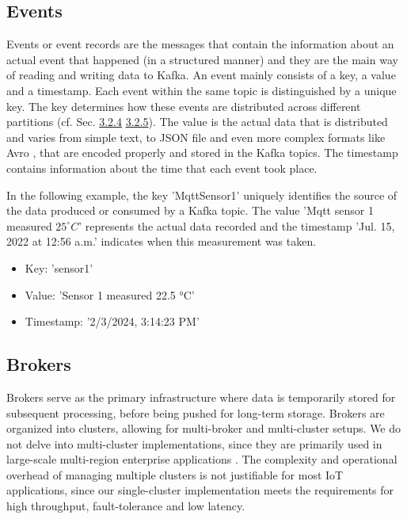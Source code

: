 \subsection{Events}
\label{events}
Events or event records are the messages that contain the information about an actual event that happened (in a structured manner) and they are the main way of reading and writing data to Kafka. An event mainly consists of a key, a value and a timestamp.
Each event within the same topic is distinguished by a unique key. The key determines how these events are distributed across different partitions (cf. Sec. \hyperref[kafka_topics]{3.2.4} \hyperref[kafka_partitions]{ 3.2.5}).
The value is the actual data that is distributed and varies from simple text, to JSON file and even more complex formats like Avro \cite{Avro}, that are encoded properly and stored in the Kafka topics. The timestamp contains information about the time that each event took place.

In the following example, the key 'MqttSensor1' uniquely identifies the source of the data produced or consumed by a Kafka topic. The value 'Mqtt sensor 1 measured $25^{\circ}C$' represents the actual data recorded and the timestamp 'Jul. 15, 2022 at 12:56 a.m.' indicates when this measurement was taken.
\begin{itemize}
    \item Key: 'sensor1'
    \item Value: 'Sensor 1 measured 22.5 \si{\celsius}'
    \item Timestamp: '2/3/2024, 3:14:23 PM'
\end{itemize}

\subsection{Brokers}
Brokers serve as the primary infrastructure where data is temporarily stored for subsequent processing, before being pushed for long-term storage. Brokers are organized into clusters, allowing for multi-broker and multi-cluster setups. We do not delve into multi-cluster implementations, since they are primarily used in large-scale multi-region enterprise applications \cite{MultiClusterImplementation}. The complexity and operational overhead of managing multiple clusters is not justifiable for most IoT applications, since our single-cluster implementation meets the requirements for high throughput, fault-tolerance and low latency. 

